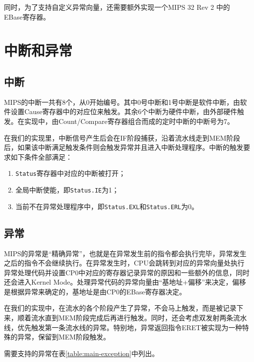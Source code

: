 同时，为了支持自定义异常向量，还需要额外实现一个MIPS 32 Rev 2 中的 EBase寄存器。

\section{中断和异常}
\subsection{中断}
MIPS的中断一共有8个，从0开始编号。其中0号中断和1号中断是软件中断，由软件设置Cause寄存器中的对应位来触发。其余6个中断为硬件中断，由外部硬件触发。在实现中，由Count/Compare寄存器组合而成的定时中断的中断号为7。

在我们的实现里，中断信号产生后会在IF阶段捕获，沿着流水线走到MEM阶段后，如果该中断满足触发条件则会触发异常并且进入中断处理程序。中断的触发要求如下条件全部满足：
\begin{enumerate}
	\item \texttt{Status}寄存器中对应的中断被打开；
	\item 全局中断使能，即\texttt{Status.IE}为1；
	\item 当前不在异常处理程序中，即\texttt{Status.EXL}和\texttt{Status.ERL}为0。
\end{enumerate}

\subsection{异常}
MIPS的异常是“精确异常”，也就是在异常发生前的指令都会执行完毕，异常发生之后的指令不会继续执行。在异常发生时，CPU会跳转到对应的异常向量处执行异常处理代码并设置CP0中对应的寄存器记录异常的原因和一些额外的信息，同时还会进入Kernel Mode。处理异常代码的异常向量由“基地址+偏移”来决定，偏移是根据异常来确定的，基地址是由CP0的EBase寄存器决定。

在我们的实现中，在流水的各个阶段产生了异常，不会马上触发，而是被记录下来，顺着流水直到MEM阶段完成后再进行触发。同时，还会考虑双发射两条流水线，优先触发第一条流水线的异常。特别地，异常返回指令ERET被实现为一种特殊的异常，保留到MEM阶段触发。

需要支持的异常在表\ref{table:main-exception}中列出。

